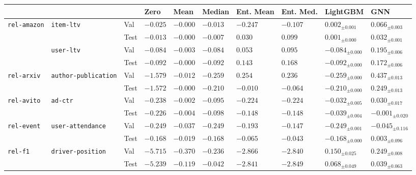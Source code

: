 \begin{tabular}{llllllllll}
\toprule
 &  &  & Zero & Mean & Median & Ent. Mean & Ent. Med. & LightGBM & GNN \\
\midrule
\multirow[c]{4}{*}{\texttt{rel-amazon}} & \multirow[c]{2}{*}{\texttt{item-ltv}} & Val & $-0.025$ & $-0.000$ & $-0.013$ & $-0.247$ & $-0.107$ & $0.002_{\pm 0.001}$ & $\bm{0.066}_{\pm 0.003}$ \\
 &  & Test & $-0.013$ & $-0.000$ & $-0.007$ & $0.030$ & $\bm{0.099}$ & $0.001_{\pm 0.000}$ & $0.032_{\pm 0.001}$ \\
\cmidrule{2-10}
 & \multirow[c]{2}{*}{\texttt{user-ltv}} & Val & $-0.084$ & $-0.003$ & $-0.084$ & $0.053$ & $0.095$ & $-0.084_{\pm 0.000}$ & $\bm{0.195}_{\pm 0.006}$ \\
 &  & Test & $-0.092$ & $-0.000$ & $-0.092$ & $0.143$ & $0.168$ & $-0.092_{\pm 0.000}$ & $\bm{0.172}_{\pm 0.006}$ \\
\cmidrule{1-10} \cmidrule{2-10}
\multirow[c]{2}{*}{\texttt{rel-arxiv}} & \multirow[c]{2}{*}{\texttt{author-publication}} & Val & $-1.579$ & $-0.012$ & $-0.259$ & $0.254$ & $0.236$ & $-0.259_{\pm 0.000}$ & $\bm{0.437}_{\pm 0.013}$ \\
 &  & Test & $-1.572$ & $-0.000$ & $-0.210$ & $-0.010$ & $-0.064$ & $-0.210_{\pm 0.000}$ & $\bm{0.249}_{\pm 0.013}$ \\
\cmidrule{1-10} \cmidrule{2-10}
\multirow[c]{2}{*}{\texttt{rel-avito}} & \multirow[c]{2}{*}{\texttt{ad-ctr}} & Val & $-0.238$ & $-0.002$ & $-0.095$ & $-0.224$ & $-0.224$ & $-0.032_{\pm 0.005}$ & $\bm{0.030}_{\pm 0.017}$ \\
 &  & Test & $-0.226$ & $-0.004$ & $-0.098$ & $-0.148$ & $-0.148$ & $-0.039_{\pm 0.004}$ & $\bm{-0.001}_{\pm 0.020}$ \\
\cmidrule{1-10} \cmidrule{2-10}
\multirow[c]{2}{*}{\texttt{rel-event}} & \multirow[c]{2}{*}{\texttt{user-attendance}} & Val & $-0.249$ & $\bm{-0.037}$ & $-0.249$ & $-0.193$ & $-0.147$ & $-0.249_{\pm 0.001}$ & $-0.045_{\pm 0.116}$ \\
 &  & Test & $-0.168$ & $-0.019$ & $-0.168$ & $-0.065$ & $-0.043$ & $-0.168_{\pm 0.000}$ & $\bm{0.003}_{\pm 0.096}$ \\
\cmidrule{1-10} \cmidrule{2-10}
\multirow[c]{2}{*}{\texttt{rel-f1}} & \multirow[c]{2}{*}{\texttt{driver-position}} & Val & $-5.715$ & $-0.370$ & $-0.236$ & $-2.866$ & $-2.840$ & $0.150_{\pm 0.025}$ & $\bm{0.249}_{\pm 0.008}$ \\
 &  & Test & $-5.239$ & $-0.119$ & $-0.042$ & $-2.841$ & $-2.849$ & $\bm{0.068}_{\pm 0.049}$ & $0.039_{\pm 0.063}$ \\

\end{tabular}
